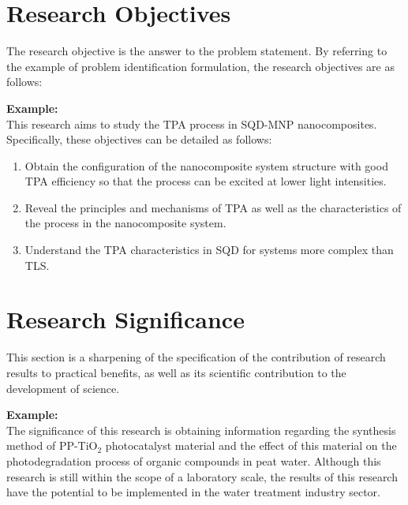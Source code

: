 \section{Research Objectives}
The research objective is the answer to the problem statement. By referring to the example of problem identification formulation, the research objectives are as follows:

\textbf{Example:} \\
This research aims to study the TPA process in SQD-MNP nanocomposites. Specifically, these objectives can be detailed as follows:
\begin{enumerate}
    \item Obtain the configuration of the nanocomposite system structure with good TPA efficiency so that the process can be excited at lower light intensities.
    \item Reveal the principles and mechanisms of TPA as well as the characteristics of the process in the nanocomposite system.
    \item Understand the TPA characteristics in SQD for systems more complex than TLS.
\end{enumerate}

\section{Research Significance}
This section is a sharpening of the specification of the contribution of research results to practical benefits, as well as its scientific contribution to the development of science.

\textbf{Example:} \\
The significance of this research is obtaining information regarding the synthesis method of PP-TiO$_2$ photocatalyst material and the effect of this material on the photodegradation process of organic compounds in peat water. Although this research is still within the scope of a laboratory scale, the results of this research have the potential to be implemented in the water treatment industry sector.
